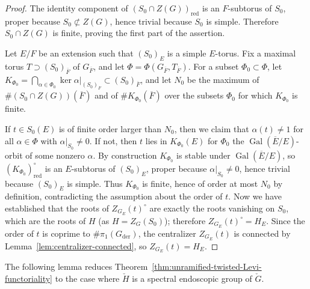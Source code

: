 \documentclass[reqno]{amsart}
\numberwithin{equation}{subsection}
\newcommand{\Gal}{\operatorname{Gal}}
\newcommand{\ol}[1]{\overline{#1}}
\DeclareMathOperator{\red}{red}
\DeclareMathOperator{\der}{der}
\newcommand{\chG}{\check{G}}
\newcommand{\chH}{\check{H}}
\theoremstyle{remark}
\numberwithin{equation}{subsection}
\numberwithin{figure}{subsection}
\begin{document}
\begin{proof}
The identity component of $(S_0 \cap Z(G))_{\red}$ is an $F$-subtorus of $S_0$, proper because $S_0 \not\subset Z(G)$, hence trivial because $S_0$ is simple. Therefore $S_0 \cap Z(G)$ is finite, proving the first part of the assertion.

Let $E/F$ be an extension such that $(S_0)_E$ is a simple $E$-torus. Fix a maximal torus $T \supset (S_0)_{\ol F}$ of $G_{\ol F}$, and let $\Phi = \Phi(G_{\ol F}, T_{\ol F})$. For a subset $\Phi_0 \subset \Phi$, let $K_{\Phi_0} = \bigcap_{\alpha \in \Phi_0} \ker \alpha|_{(S_0)_{\ol F}} \subset (S_0)_{\ol F}$, and let $N_0$ be the maximum of $\#(S_0 \cap Z(G))(\ol F)$ and of $\#K_{\Phi_0}(\ol F)$ over the subsets $\Phi_0$ for which $K_{\Phi_0}$ is finite.

If $t \in S_0(E)$ is of finite order larger than $N_0$, then we claim that $\alpha(t) \neq 1$ for all $\alpha \in \Phi$ with $\alpha|_{S_0} \neq 0$. If not, then $t$ lies in $K_{\Phi_0}(E)$ for $\Phi_0$ the $\Gal(\ol E/E)$-orbit of some nonzero $\alpha$. By construction $K_{\Phi_0}$ is stable under $\Gal(\ol E/E)$, so $(K_{\Phi_0})^\circ_{\red}$ is an $E$-subtorus of $(S_0)_E$, proper because $\alpha|_{S_0} \neq 0$, hence trivial because $(S_0)_E$ is simple. Thus $K_{\Phi_0}$ is finite, hence of order at most $N_0$ by definition, contradicting the assumption about the order of $t$. Now we have established that the roots of $Z_{G_E}(t)^\circ$ are exactly the roots vanishing on $S_0$, which are the roots of $H$ (as $H = Z_G(S_0)$); therefore $Z_{G_E}(t)^\circ = H_E$. Since the order of $t$ is coprime to $\#\pi_1(G_{\der})$, the centralizer $Z_{G_E}(t)$ is connected by Lemma~\ref{lem:centralizer-connected}, so $Z_{G_E}(t) = H_E$.
\end{proof}

The following lemma reduces Theorem~\ref{thm:unramified-twisted-Levi-functoriality} to the case where $\chH$ is a spectral endoscopic group of $\chG$.
\end{document}
